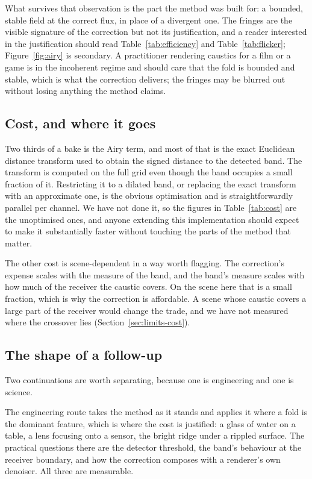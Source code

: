 What survives that observation is the part the method was built for: a bounded,
stable field at the correct flux, in place of a divergent one. The fringes are
the visible signature of the correction but not its justification, and a reader
interested in the justification should read Table~\ref{tab:efficiency} and Table~\ref{tab:flicker}; Figure~\ref{fig:airy} is secondary. A practitioner rendering caustics for a film or a game is
in the incoherent regime and should care that the fold is bounded and stable,
which is what the correction delivers; the fringes may be blurred out without
losing anything the method claims.

\subsection{Cost, and where it goes}
\label{sec:disc-cost}

Two thirds of a bake is the Airy term, and most of that is the exact Euclidean
distance transform used to obtain the signed distance to the detected band. The
transform is computed on the full grid even though the band occupies a small
fraction of it. Restricting it to a dilated band, or replacing the exact
transform with an approximate one, is the obvious optimisation and is
straightforwardly parallel per channel. We have not done it, so the figures in
Table~\ref{tab:cost} are the unoptimised ones, and anyone extending this
implementation should expect to make it substantially faster without touching
the parts of the method that matter.

The other cost is scene-dependent in a way worth flagging. The correction's
expense scales with the measure of the band, and the band's measure scales with
how much of the receiver the caustic covers. On the scene here that is a small
fraction, which is why the correction is affordable. A scene whose caustic
covers a large part of the receiver would change the trade, and we have not
measured where the crossover lies (Section~\ref{sec:limits-cost}).

\subsection{The shape of a follow-up}
\label{sec:disc-followup}

Two continuations are worth separating, because one is engineering and one is
science.

The engineering route takes the method as it stands and applies it where
a fold is the dominant feature, which is where the cost is justified: a glass
of water on a table, a lens focusing onto a sensor, the bright ridge under a
rippled surface. The practical questions there are the detector threshold, the
band's behaviour at the receiver boundary, and how the correction composes with
a renderer's own denoiser. All three are measurable.

